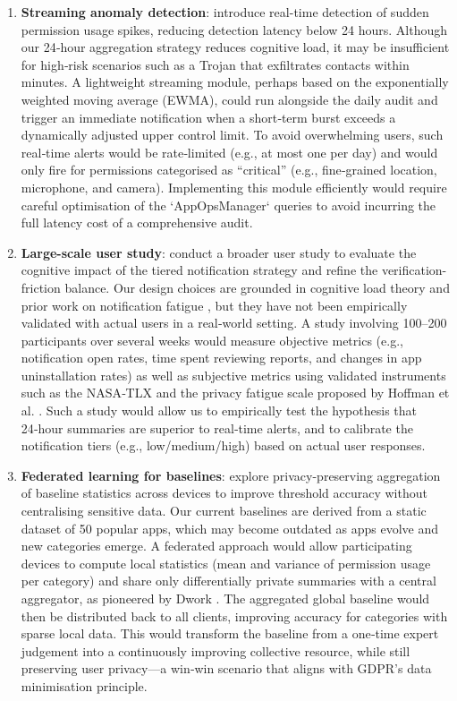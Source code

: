\begin{enumerate}
\item \textbf{Streaming anomaly detection}: introduce real-time detection of sudden permission usage spikes, reducing detection latency below 24 hours. Although our 24‑hour aggregation strategy reduces cognitive load, it may be insufficient for high‑risk scenarios such as a Trojan that exfiltrates contacts within minutes. A lightweight streaming module, perhaps based on the exponentially weighted moving average (EWMA), could run alongside the daily audit and trigger an immediate notification when a short‑term burst exceeds a dynamically adjusted upper control limit. To avoid overwhelming users, such real‑time alerts would be rate‑limited (e.g., at most one per day) and would only fire for permissions categorised as ``critical'' (e.g., fine‑grained location, microphone, and camera). Implementing this module efficiently would require careful optimisation of the `AppOpsManager` queries to avoid incurring the full latency cost of a comprehensive audit.

\item \textbf{Large-scale user study}: conduct a broader user study to evaluate the cognitive impact of the tiered notification strategy and refine the verification-friction balance. Our design choices are grounded in cognitive load theory \cite{27} and prior work on notification fatigue \cite{12}, but they have not been empirically validated with actual users in a real‑world setting. A study involving 100–200 participants over several weeks would measure objective metrics (e.g., notification open rates, time spent reviewing reports, and changes in app uninstallation rates) as well as subjective metrics using validated instruments such as the NASA‑TLX \cite{6} and the privacy fatigue scale proposed by Hoffman et al. \cite{10}. Such a study would allow us to empirically test the hypothesis that 24‑hour summaries are superior to real‑time alerts, and to calibrate the notification tiers (e.g., low/medium/high) based on actual user responses.

\item \textbf{Federated learning for baselines}: explore privacy-preserving aggregation of baseline statistics across devices to improve threshold accuracy without centralising sensitive data. Our current baselines are derived from a static dataset of 50 popular apps, which may become outdated as apps evolve and new categories emerge. A federated approach would allow participating devices to compute local statistics (mean and variance of permission usage per category) and share only differentially private summaries with a central aggregator, as pioneered by Dwork \cite{46}. The aggregated global baseline would then be distributed back to all clients, improving accuracy for categories with sparse local data. This would transform the baseline from a one‑time expert judgement into a continuously improving collective resource, while still preserving user privacy—a win‑win scenario that aligns with GDPR's data minimisation principle.
\end{enumerate}

